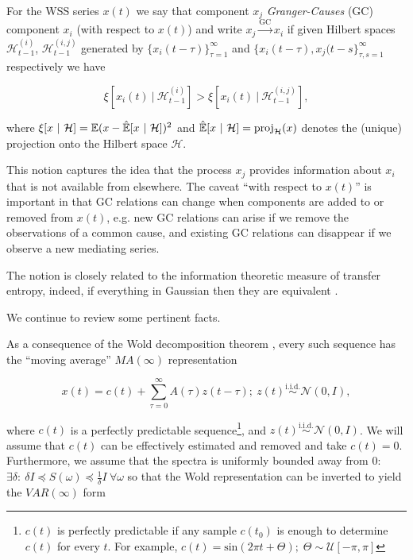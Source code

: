 \documentclass[12pt]{article}
\def\gc{\overset{\text{GC}}{\rightarrow}}
\begin{document}
\begin{definition}
  For the WSS series $x(t)$ we say that component $x_j$
  \textit{Granger-Causes} (GC) component $x_i$ (with respect to
  $x(t)$) and write $x_j \gc x_i$ if given Hilbert spaces
  $\mathcal{H}^{(i)}_{t - 1}$, $\mathcal{H}^{(i, j)}_{t - 1}$
  generated by $\{x_i(t - \tau)\}_{\tau = 1}^\infty$ and
  $\{x_i(t - \tau), x_j(t - s\}_{\tau, s = 1}^\infty$ respectively we have

\begin{equation}
  \xi[x_i(t) \ |\ \mathcal{H}^{(i)}_{t - 1}] > \xi[x_i(t) \ |\ \mathcal{H}^{(i, j)}_{t - 1}],
\end{equation}

where
$\xi[x \ |\ \mathcal{H}] = \mathbb{E} (x - \hat{\mathbb{E}}[x \ |\ \mathcal{H}])^2$ and
$\hat{\mathbb{E}}[x \ |\ \mathcal{H}] = \text{proj}_{\mathcal{H}}(x)$ denotes
the (unique) projection onto the Hilbert space $\mathcal{H}$.
\end{definition}

This notion captures the idea that the process $x_j$ provides
information about $x_i$ that is not available from elsewhere.  The
caveat ``with respect to $x(t)$'' is important in that GC relations
can change when components are added to or removed from $x(t)$,
e.g. new GC relations can arise if we remove the observations of a
common cause, and existing GC relations can disappear if we observe a
new mediating series.

The notion is closely related to the information theoretic measure of
transfer entropy, indeed, if everything in Gaussian then they are
equivalent \cite{barnett2009granger}.

We continue to review some pertinent facts.

As a consequence of the Wold decomposition theorem \cite{lindquist},
every such sequence has the ``moving average'' $MA(\infty)$ representation

\begin{equation}
\label{eqn:wold}
  x(t) = c(t) + \sum_{\tau = 0}^\infty A(\tau) z(t - \tau);\ z(t) \overset{\text{i.i.d.}}{\sim} \mathcal{N}(0, I),
\end{equation}

where $c(t)$ is a perfectly predictable sequence\footnote{$c(t)$ is
  perfectly predictable if any sample $c(t_0)$ is enough to determine
  $c(t)$ for every $t$.  For example,
  $c(t) = \text{sin}(2\pi t + \Theta);\; \Theta \sim \mathcal{U}[-\pi, \pi]$}, and
$z(t) \overset{\text{i.i.d.}}{\sim} \mathcal{N}(0, I)$.  We will assume
that $c(t)$ can be effectively estimated and removed and take
$c(t) = 0$.  Furthermore, we assume that the spectra is uniformly
bounded away from $0$:
$\exists \delta:\ \delta I \preceq S(\omega) \preceq \frac{1}{\delta} I\ \forall \omega$ so that the Wold
representation can be inverted to yield the $VAR(\infty)$ form
\end{document}
